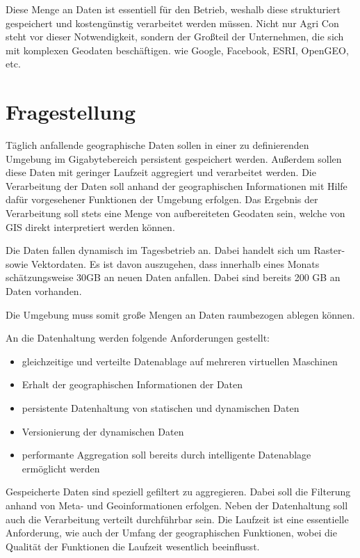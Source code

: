 \documentclass[
a4paper,     %
12pt         %
]{scrartcl}  %
\begin{document}
Diese Menge an Daten ist essentiell für den Betrieb, weshalb diese strukturiert gespeichert und kostengünstig verarbeitet werden müssen.
Nicht nur Agri Con steht vor dieser Notwendigkeit, sondern der Großteil der Unternehmen, die sich mit komplexen Geodaten beschäftigen.
wie Google, Facebook, ESRI, OpenGEO, etc.


\section{Fragestellung}

Täglich anfallende geographische Daten sollen in einer zu definierenden Umgebung im Gigabytebereich persistent gespeichert werden.
Außerdem sollen diese Daten mit geringer Laufzeit aggregiert und verarbeitet werden.
Die Verarbeitung der Daten soll anhand der geographischen Informationen mit Hilfe dafür vorgesehener Funktionen der Umgebung erfolgen.
Das Ergebnis der Verarbeitung soll stets eine Menge von aufbereiteten Geodaten sein, welche von GIS direkt interpretiert werden können.

Die Daten fallen dynamisch im Tagesbetrieb an.
Dabei handelt sich um Raster- sowie Vektordaten.
Es ist davon auszugehen, dass innerhalb eines Monats schätzungsweise 30GB an neuen Daten anfallen.
Dabei sind bereits 200 GB an Daten vorhanden.

Die Umgebung muss somit große Mengen an Daten raumbezogen ablegen können.

An die Datenhaltung werden folgende Anforderungen gestellt:
\begin{itemize}
\item gleichzeitige und verteilte Datenablage auf mehreren virtuellen Maschinen
\item Erhalt der geographischen Informationen der Daten
\item persistente Datenhaltung von statischen und dynamischen Daten
\item Versionierung der dynamischen Daten
\item performante Aggregation soll bereits durch intelligente Datenablage ermöglicht werden
\end{itemize}

Gespeicherte Daten sind speziell gefiltert zu aggregieren.
Dabei soll die Filterung anhand von Meta- und Geoinformationen erfolgen.
Neben der Datenhaltung soll auch die Verarbeitung verteilt durchführbar sein.
Die Laufzeit ist eine essentielle Anforderung, wie auch der Umfang der geographischen Funktionen, wobei die Qualität der Funktionen die Laufzeit wesentlich beeinflusst.
\end{document}
